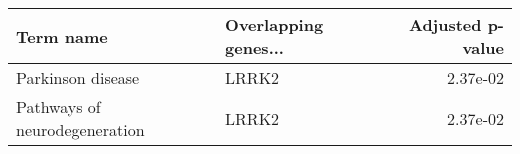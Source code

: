 \begin{tabular}{llr}
\toprule
                    Term name & Overlapping genes... &  Adjusted p-value \\
\midrule
            Parkinson disease &                LRRK2 &          2.37e-02 \\
Pathways of neurodegeneration &                LRRK2 &          2.37e-02 \\
\bottomrule
\end{tabular}
